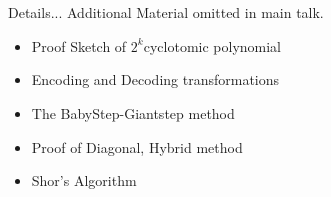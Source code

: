 \appendix
\section{\appendixname}
\begin{frame}{Details...}
  Additional Material omitted in main talk.

  \begin{itemize}
    \item Proof Sketch of $2^k$\th cyclotomic polynomial
    \item Encoding and Decoding transformations
    \item The BabyStep-Giantstep method
    \item Proof of Diagonal, Hybrid method
    \item Shor's Algorithm
  \end{itemize}
\end{frame}
